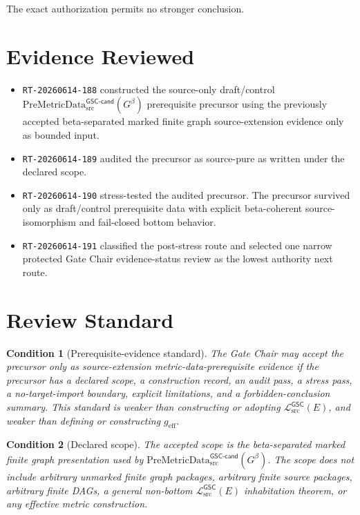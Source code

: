 \documentclass[11pt]{article}
\newcommand{\PreMetricData}{\mathrm{PreMetricData}_{\mathrm{src}}^{\mathsf{GSC\mbox{-}cand}}}
\newcommand{\Gbeta}{G^{\beta}}
\newcommand{\MetricData}{\mathcal{L}_{\mathrm{src}}^{\mathsf{GSC}}}
\newcommand{\geff}{g_{\mathrm{eff}}}
\newtheorem{condition}{Condition}
\begin{document}
The exact authorization permits no stronger conclusion.

\section{Evidence Reviewed}

\begin{itemize}[leftmargin=*]
  \item \texttt{RT-20260614-188} constructed the source-only draft/control
  \(\PreMetricData(\Gbeta)\) prerequisite precursor using the previously
  accepted beta-separated marked finite graph source-extension evidence only
  as bounded input.
  \item \texttt{RT-20260614-189} audited the precursor as source-pure as
  written under the declared scope.
  \item \texttt{RT-20260614-190} stress-tested the audited precursor. The
  precursor survived only as draft/control prerequisite data with explicit
  beta-coherent source-isomorphism and fail-closed bottom behavior.
  \item \texttt{RT-20260614-191} classified the post-stress route and selected
  one narrow protected Gate Chair evidence-status review as the lowest
  authority next route.
\end{itemize}

\section{Review Standard}

\begin{condition}[Prerequisite-evidence standard]
The Gate Chair may accept the precursor only as source-extension
metric-data-prerequisite evidence if the precursor has a declared scope, a
construction record, an audit pass, a stress pass, a no-target-import boundary,
explicit limitations, and a forbidden-conclusion summary. This standard is
weaker than constructing or adopting \(\MetricData(E)\), and weaker than
defining or constructing \(\geff\).
\end{condition}

\begin{condition}[Declared scope]
The accepted scope is the beta-separated marked finite graph presentation used
by \(\PreMetricData(\Gbeta)\). The scope does not include arbitrary unmarked
finite graph packages, arbitrary finite source packages, arbitrary finite
DAGs, a general non-bottom \(\MetricData(E)\) inhabitation theorem, or any
effective metric construction.
\end{condition}
\end{document}
